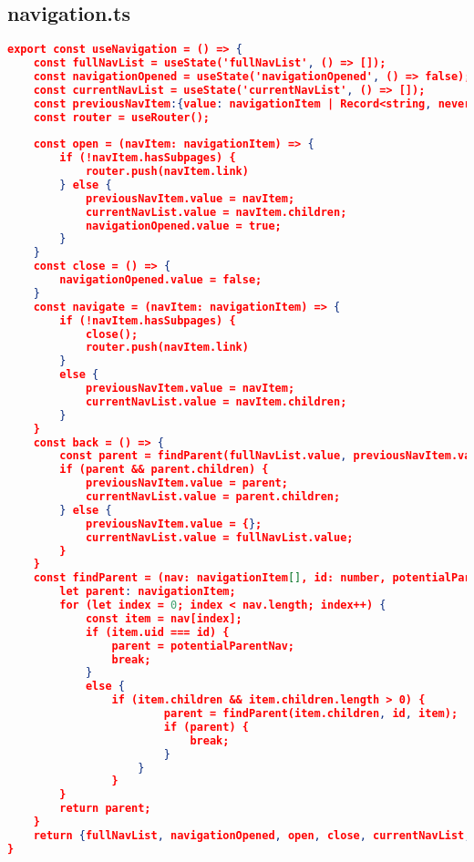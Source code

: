 \subsection{navigation.ts}
\label{navigation.ts}

\begin{lstlisting}[language=json,firstnumber=1]
export const useNavigation = () => {
    const fullNavList = useState('fullNavList', () => []);
    const navigationOpened = useState('navigationOpened', () => false);
    const currentNavList = useState('currentNavList', () => []);
    const previousNavItem:{value: navigationItem | Record<string, never>} = useState('previousNavItem');
    const router = useRouter();
    
    const open = (navItem: navigationItem) => {
        if (!navItem.hasSubpages) {
            router.push(navItem.link)
        } else {
            previousNavItem.value = navItem;
            currentNavList.value = navItem.children;
            navigationOpened.value = true;  
        } 
    }
    const close = () => {
        navigationOpened.value = false;
    }
    const navigate = (navItem: navigationItem) => {
        if (!navItem.hasSubpages) {
            close();
            router.push(navItem.link)
        }
        else {
            previousNavItem.value = navItem;
            currentNavList.value = navItem.children;
        }
    }
    const back = () => {
        const parent = findParent(fullNavList.value, previousNavItem.value.uid);
        if (parent && parent.children) {
            previousNavItem.value = parent;
            currentNavList.value = parent.children;
        } else {
            previousNavItem.value = {};
            currentNavList.value = fullNavList.value;
        }
    }
    const findParent = (nav: navigationItem[], id: number, potentialParentNav?: navigationItem) => {
        let parent: navigationItem;
        for (let index = 0; index < nav.length; index++) {
            const item = nav[index];
            if (item.uid === id) {
                parent = potentialParentNav;
                break;
            } 
            else {
                if (item.children && item.children.length > 0) {
                        parent = findParent(item.children, id, item);
                        if (parent) {
                            break;
                        }
                    }
                }
        }
        return parent;
    }
    return {fullNavList, navigationOpened, open, close, currentNavList, previousNavItem, navigate, back};
}
\end{lstlisting}

